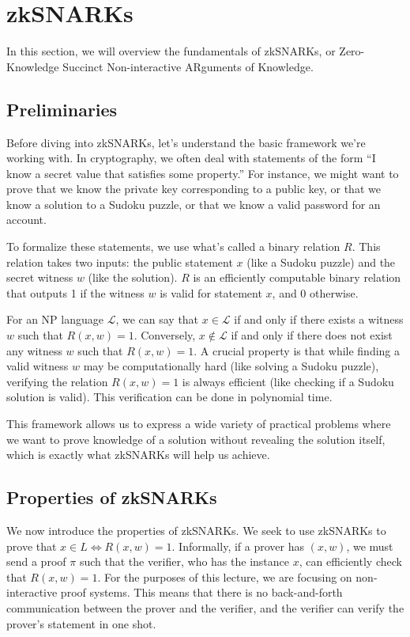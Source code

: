 

\section{zkSNARKs}

In this section, we will overview the fundamentals of zkSNARKs, or Zero-Knowledge Succinct Non-interactive ARguments of Knowledge.

\subsection{Preliminaries}

Before diving into zkSNARKs, let's understand the basic framework we're working with. In cryptography, we often deal with statements of the form ``I know a secret value that satisfies some property.'' For instance, we might want to prove that we know the private key corresponding to a public key, or that we know a solution to a Sudoku puzzle, or that we know a valid password for an account.

To formalize these statements, we use what's called a binary relation $R$. This relation takes two inputs: the public statement $x$ (like a Sudoku puzzle) and the secret witness $w$ (like the solution). $R$ is an efficiently computable binary relation that outputs 1 if the witness $w$ is valid for statement $x$, and 0 otherwise.

For an NP language $\mathcal{L}$, we can say that $x \in \mathcal{L}$ if and only if there exists a witness $w$ such that $R(x, w) = 1$. Conversely, $x \notin \mathcal{L}$ if and only if there does not exist any witness $w$ such that $R(x, w) = 1$. A crucial property is that while finding a valid witness $w$ may be computationally hard (like solving a Sudoku puzzle), verifying the relation $R(x,w)=1$ is always efficient (like checking if a Sudoku solution is valid). This verification can be done in polynomial time.

This framework allows us to express a wide variety of practical problems where we want to prove knowledge of a solution without revealing the solution itself, which is exactly what zkSNARKs will help us achieve.

\subsection{Properties of zkSNARKs}

We now introduce the properties of zkSNARKs. We seek to use zkSNARKs to prove that $x \in L \iff R(x, w) = 1$. Informally, if a prover has $(x, w)$, we must send a proof $\pi$ such that the verifier, who has the instance $x$, can efficiently check that $R(x, w) = 1$. For the purposes of this lecture, we are focusing on non-interactive proof systems. This means that there is no back-and-forth communication between the prover and the verifier, and the verifier can verify the prover's statement in one shot.

